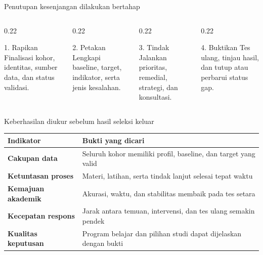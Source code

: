\begin{frame}{Penutupan kesenjangan dilakukan bertahap}
  \begin{columns}[T,onlytextwidth]
    \begin{column}{0.22\textwidth}
      \begin{block}{1. Rapikan}
        Finalisasi kohor, identitas, sumber data, dan status validasi.
      \end{block}
    \end{column}
    \begin{column}{0.22\textwidth}
      \begin{block}{2. Petakan}
        Lengkapi baseline, target, indikator, serta jenis kesalahan.
      \end{block}
    \end{column}
    \begin{column}{0.22\textwidth}
      \begin{block}{3. Tindak}
        Jalankan prioritas, remedial, strategi, dan konsultasi.
      \end{block}
    \end{column}
    \begin{column}{0.22\textwidth}
      \begin{block}{4. Buktikan}
        Tes ulang, tinjau hasil, dan tutup atau perbarui status gap.
      \end{block}
    \end{column}
  \end{columns}
  \vspace{0.23cm}
\end{frame}

\begin{frame}{Keberhasilan diukur sebelum hasil seleksi keluar}
  {\fontsize{10.0}{12.5}\selectfont
  \renewcommand{\arraystretch}{0.99}
  \begin{tabularx}{\textwidth}{>{\bfseries\color{StudentBlue}}p{} >{\RaggedRight\arraybackslash}X}
    \toprule
    \textbf{Indikator} & \textbf{Bukti yang dicari} \\
    \midrule
    Cakupan data & Seluruh kohor memiliki profil, baseline, dan target yang valid \\
    Ketuntasan proses & Materi, latihan, serta tindak lanjut selesai tepat waktu \\
    Kemajuan akademik & Akurasi, waktu, dan stabilitas membaik pada tes setara \\
    Kecepatan respons & Jarak antara temuan, intervensi, dan tes ulang semakin pendek \\
    Kualitas keputusan & Program belajar dan pilihan studi dapat dijelaskan dengan bukti \\
    \bottomrule
  \end{tabularx}}
\end{frame}

